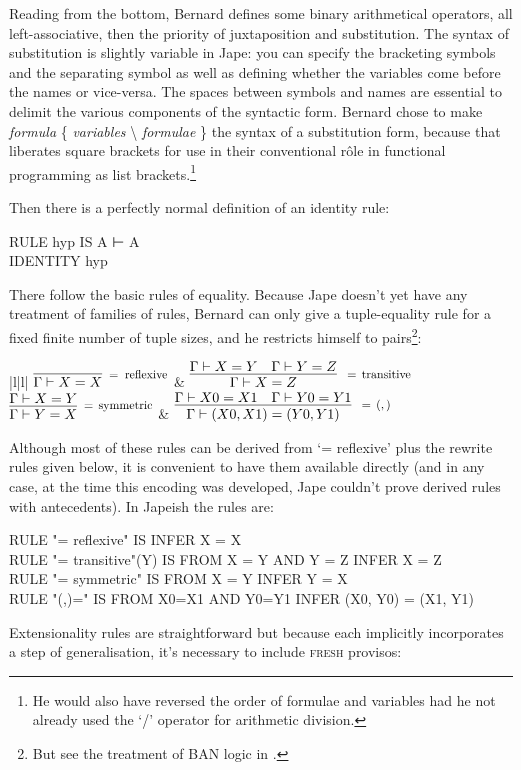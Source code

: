 Reading from the bottom, Bernard defines some binary arithmetical operators, all left-associative, then the priority of juxtaposition and substitution. The syntax of substitution is slightly variable in Jape: you can specify the bracketing symbols and the separating symbol as well as defining whether the variables come before the names or vice-versa. The spaces between symbols and names are essential to delimit the various components of the syntactic form. Bernard chose to make \textit{formula} \{ \textit{variables} \textbackslash\; \textit{formulae} \} the syntax of a substitution form, because that liberates square brackets for use in their conventional r\^{o}le in functional programming as list brackets.\footnote{He would also have reversed the order of formulae and variables had he not already used the `/' operator for arithmetic division.}

Then there is a perfectly normal definition of an identity rule:
\begin{japeish}
RULE hyp IS A ⊢ A \\
IDENTITY hyp
\end{japeish}
There follow the basic rules of equality. Because Jape doesn't yet have any treatment of families of rules, Bernard can only give a tuple-equality rule for a fixed finite number of tuple sizes, and he restricts himself to pairs\footnote{But see the treatment of BAN logic in .}:\\

\begin{ruletab}{|l|l|}
\hline
$\infer[\reason{$=\;\operatorname{reflexive}$}]
       {\Gamma  |- X=X}
       {}$
& 
$\infer[\reason{$
\;=\,\operatorname{transitive}$}]
       {\Gamma  |- X=Z}
       {\Gamma  |- X=Y\quad \Gamma  |- Y=Z}$
\\
\hline
$\infer[\reason{$=\,\operatorname{symmetric}$}]
       {\Gamma  |- Y=X}
       {\Gamma  |- X=Y}$
& 
$\infer[\reason{$
\;=\,(,)$}]
       {\Gamma  |- (X0,X1)=(Y0,Y1)}
       {\Gamma  |- X0=X1\quad \Gamma  |- Y0=Y1}$
\\
\hline
\end{ruletab}


Although most of these rules can be derived from `= reflexive' plus the rewrite rules given below, it is convenient to have them available directly (and in any case, at the time this encoding was developed, Jape couldn't prove derived rules with antecedents). In Japeish the rules are:
\begin{japeish}
RULE "= reflexive"          IS                                  INFER X = X\\
RULE "= transitive"(Y)      IS FROM X = Y AND Y = Z             INFER X = Z\\
RULE "= symmetric"          IS FROM X = Y                       INFER Y = X\\
RULE "(,)="                 IS FROM X0=X1 AND Y0=Y1 INFER (X0, Y0) = (X1, Y1)
\end{japeish}
Extensionality rules are straightforward but because each implicitly incorporates a step of generalisation, it's necessary to include \textsc{fresh} provisos:

